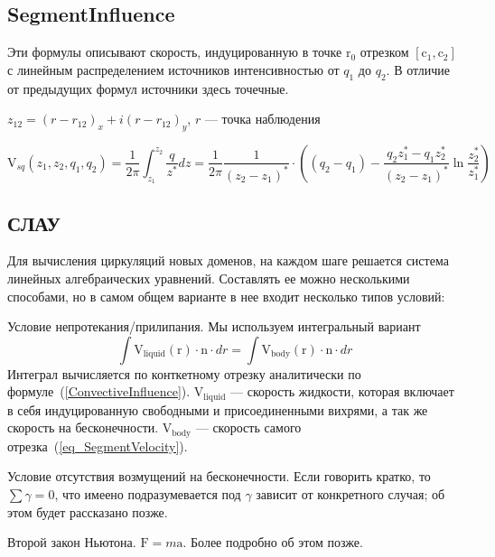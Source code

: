 \documentclass[14pt]{extreport}
\newcommand{\br}[1]{\boldsymbol{\mathrm{#1}}}
\renewcommand{\vec}[1]{\br{#1}}
\newenvironment{packed_enum}{
\begin{enumerate}
  \setlength{\itemsep}{1pt}
  \setlength{\parskip}{0pt}
  \setlength{\parsep}{0pt}
}{\end{enumerate}}
\begin{document}
\subsection{SegmentInfluence}
\label{SegmentInfluence}

Эти формулы описывают скорость, индуцированную в точке $\vec r_0$ отрезком $[\vec c_1, \vec c_2]$ с линейным распределением источников интенсивностью от $q_1$ до $q_2$. В отличие от предыдущих формул источники здесь точечные.

$z_{12} = (r - r_{12})_x + i (r-r_{12})_y$, $r$ --- точка наблюдения

\begin{equation}
\label{eq_SegmentInfluence_source}
\vec V_{sq} (z_1, z_2, q_1, q_2) = \dfrac{1}{2\pi}  \int_{z_1}^{z_2}\dfrac{q}{z^*} dz = \dfrac{1}{2\pi} \dfrac{1}{(z_2-z_1)^*} \cdot \left(  (q_2-q_1) - \dfrac{q_2 z_1^* - q_1 z_2^*}{(z_2-z_1)^*}\ln \dfrac{z_2^*}{z_1^*} \right)
\end{equation}
 



\subsection{СЛАУ}

Для вычисления циркуляций новых доменов, на каждом шаге решается система линейных алгебраических уравнений. Составлять ее можно несколькими способами, но в самом общем варианте в нее входит несколько типов условий:

\begin{packed_enum}
\item Условие непротекания/прилипания. Мы используем интегральный вариант
\begin{equation*}
\int{\vec V_\text{liquid}(\vec r) \cdot \vec n \cdot dr} = \int {\vec V_\text{body}(\vec r) \cdot \vec n \cdot dr}
\end{equation*}
Интеграл вычисляется по конткетному отрезку аналитически по формуле~(\ref{ConvectiveInfluence}). $\br V_\text{liquid}$ --- скорость жидкости, которая включает в себя индуцированную свободными и присоединенными вихрями, а так же скорость на бесконечности. $\br V_\text{body}$ --- скорость самого отрезка~(\ref{eq_SegmentVelocity}).
\item Условие отсутствия возмущений на бесконечности. Если говорить кратко, то $\sum \gamma = 0$, что имеено подразумевается под $\gamma$ зависит от конкретного случая; об этом будет рассказано позже.
\item Второй закон Ньютона. $\br F = m \br a$. Более подробно об этом позже.
\end{packed_enum}
\end{document}
